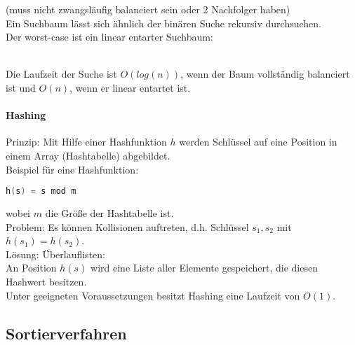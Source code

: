 \documentclass{scrreprt}
\begin{document}
(muss nicht zwangsläufig balanciert sein oder 2 Nachfolger haben)\\
Ein Suchbaum lässt sich ähnlich der binären Suche rekursiv durchsuchen.\\
Der worst-case ist ein linear entarter Suchbaum:\\
\\
Die Laufzeit der Suche ist $O(log(n))$, wenn der Baum vollständig balanciert ist und $O(n)$, wenn er linear entartet ist.

\paragraph{Hashing}
Prinzip: Mit Hilfe einer Hashfunktion $h$ werden Schlüssel auf eine Position in einem Array (Hashtabelle) abgebildet.\\
Beispiel für eine Hashfunktion:
\begin{lstlisting}[language=C]
h(s) = s mod m
\end{lstlisting}
wobei $m$ die Größe der Hashtabelle ist.\\
Problem: Es können Kollisionen auftreten, d.h. Schlüssel $s_1,s_2$ mit $h(s_1)=h(s_2)$. \\
Lösung: Überlauflisten:\\
An Position $h(s)$ wird eine Liste aller Elemente gespeichert, die diesen Hashwert besitzen.\\
Unter geeigneten Voraussetzungen besitzt Hashing eine Laufzeit von $O(1)$.

\subsection{Sortierverfahren}
\end{document}
